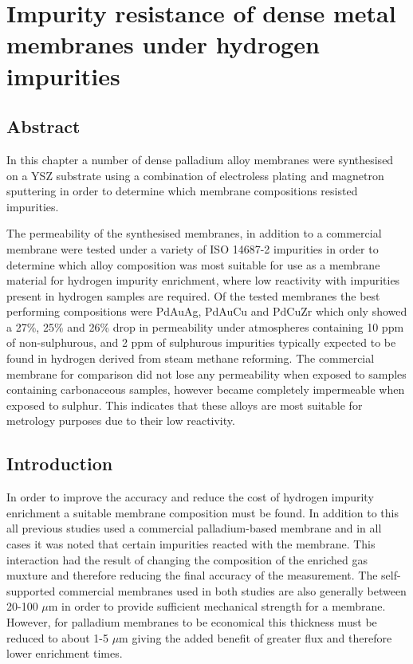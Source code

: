 

\chapter{Impurity resistance of dense metal membranes under hydrogen impurities}\label{testingchapref}
\section*{Abstract}
In this chapter a number of dense palladium alloy membranes were synthesised on a YSZ substrate using a combination of electroless plating and magnetron sputtering in order to determine which membrane compositions resisted impurities. 

The permeability of the synthesised membranes, in addition to a commercial membrane were tested under a variety of ISO 14687-2 impurities in order to determine which alloy composition was most suitable for use as a membrane material for hydrogen impurity enrichment, where low reactivity with impurities present in hydrogen samples are required. Of the tested membranes the best performing compositions were PdAuAg, PdAuCu and PdCuZr which only showed a 27\%, 25\% and 26\% drop in permeability under atmospheres containing 10 ppm of non-sulphurous, and 2 ppm of sulphurous impurities typically expected to be found in hydrogen derived from steam methane reforming. The commercial membrane for comparison did not lose any permeability when exposed to samples containing carbonaceous samples, however became completely impermeable when exposed to sulphur. This indicates that these alloys are most suitable for metrology purposes due to their low reactivity. 

\section{Introduction}
In order to improve the accuracy and reduce the cost of hydrogen impurity enrichment a suitable membrane composition must be found. In addition to this all previous studies used a commercial palladium-based membrane and in all cases it was noted that certain impurities reacted with the membrane. This interaction had the result of changing the composition of the enriched gas muxture and therefore reducing the final accuracy of the measurement. \cite{Murugan2014, Ahmed2010} The self-supported commercial membranes used in both studies are also generally between 20-100 $\mu$m in order to provide sufficient mechanical strength for a membrane. However, for palladium membranes to be economical this thickness must be reduced to about 1-5 $\mu$m giving the added benefit of greater flux and therefore lower enrichment times. 

